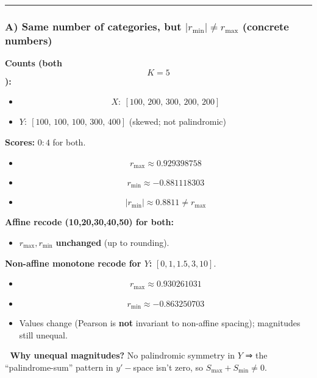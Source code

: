 \documentclass[
  12pt,
]{article}
\providecommand{\tightlist}{%
  \setlength{\itemsep}{0pt}\setlength{\parskip}{0pt}}
\theoremstyle{plain}
\theoremstyle{definition}
\theoremstyle{remark}
\begin{document}
\begin{center}\rule{0.5\linewidth}{0.5pt}\end{center}

\subsubsection{\texorpdfstring{A) \textbf{Same number of categories, but
\(|r_{\min}|\ne r_{\max}\)} (concrete
numbers)}{A) Same number of categories, but \textbar r\_\{\textbackslash min\}\textbar\textbackslash ne r\_\{\textbackslash max\} (concrete numbers)}}\label{a-same-number-of-categories-but-r_minne-r_max-concrete-numbers}

\textbf{Counts (both \[K=5\]):}

\begin{itemize}
\item
  \[X:\ [100,\,200,\,300,\,200,\,200]\]
\item
  \(Y:\ [100,\,100,\,100,\,300,\,400]\) (skewed; not palindromic)
\end{itemize}

\textbf{Scores:} \(0{:}4\) for both.

\begin{itemize}
\item
  \[r_{\max}\approx 0.929398758\]
\item
  \[r_{\min}\approx -0.881118303\]
\item
  \[|r_{\min}| \approx 0.8811 \ne r_{\max}\]
\end{itemize}

\textbf{Affine recode (10,20,30,40,50) for both:}

\begin{itemize}
\tightlist
\item
  \(r_{\max}, r_{\min}\) \textbf{unchanged} (up to rounding).
\end{itemize}

\textbf{Non-affine monotone recode for \(Y\):} \([0,1,1.5,3,10]\).

\begin{itemize}
\item
  \[r_{\max}\approx 0.930261031\]
\item
  \[r_{\min}\approx -0.863250703\]
\item
  Values change (Pearson is \textbf{not} invariant to non-affine
  spacing); magnitudes still unequal.
\end{itemize}

🧠 \textbf{Why unequal magnitudes?} No palindromic symmetry in \(Y\) ⇒
the ``palindrome-sum'' pattern in \(y'-\)space isn't zero, so
\(S_{\max}+S_{\min}\ne 0\).
\end{document}
